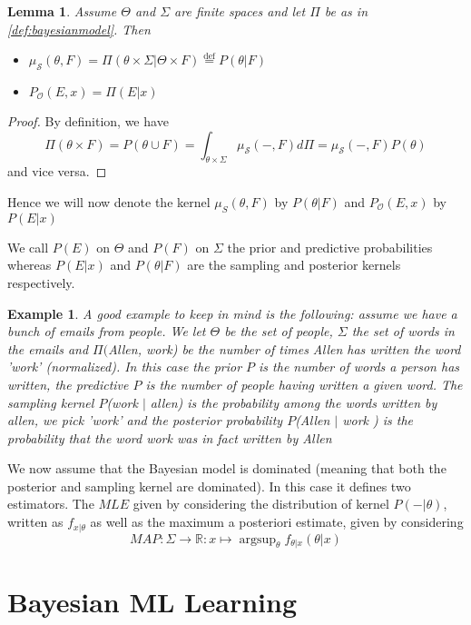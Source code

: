 \documentclass{book}
\theoremstyle{plain}
\newtheorem{example}[corollary]{Example}
\newtheorem{lemma}[corollary]{Lemma}
\theoremstyle{definition}
\DeclareMathOperator{\argsup}{argsup}
\renewcommand{\d}[1]{\mathbb{#1}}
\newcommand{\define}{\stackrel{\operatorname{def}}{=}}
\newcommand{\fun}{\mapsto}
\newcommand{\mor}{\longrightarrow}
\renewcommand{\r}[1]{\mathcal{#1}}
\begin{document}
\begin{lemma}
Assume $\Theta$ and $\Sigma$ are finite spaces and let $\Pi$ be as in \ref{def:bayesianmodel}. Then
\begin{itemize}
\item $\mu_\r{S}(\theta,F)=\Pi(\theta\times \Sigma \vert \Theta\times F)\define P(\theta\vert F)$
\item $P_\r{O}(E,x)=\Pi(E\vert x)$
\end{itemize}
\end{lemma}

\begin{proof}
By definition, we have
\[
\Pi(\theta \times F)=P(\theta\cup F)=\int_{\theta\times \Sigma} \mu_\r{S}(-,F)d\Pi=\mu_\r{S}(-,F)P(\theta)
\]
and vice versa.	
\end{proof}

Hence we will now denote the kernel $\mu_{S}(\theta , F)$ by $P(\theta \vert F)$ and $P_\r{O}(E,x)$ by $P(E\vert x)$

We call $P(E)$ on $\Theta$ and $P(F)$ on $\Sigma$ the prior and predictive probabilities whereas $P(E\vert x)$ and $P(\theta\vert F)$ are the sampling and posterior kernels respectively.

\begin{example}
A good example to keep in mind is the following: assume we have a bunch of emails from people. We let $\Theta$ be the set of people, $\Sigma$ the set of words in the emails and $\Pi($Allen, work) be the number of times Allen has written the word 'work' (normalized). In this case the prior  $P$ is the number of words a person has written, the predictive $P$  is the number of people having written a given word. The sampling kernel $P$(work $\vert$ allen) is the probability among the words written by allen, we pick 'work' and the posterior probability $P$(Allen $\vert$ work ) is the probability that the word work was in fact written by Allen
\end{example}
 
We now assume that the Bayesian model is dominated (meaning that both the posterior and sampling kernel are dominated). 
In this case it defines two estimators. The $MLE$ given by considering the distribution of kernel $P(- \vert \theta)$, written as $f_{x\vert \theta}$ as well as the maximum a posteriori estimate, given by considering
\[
MAP: \Sigma \mor \d{R}: x \fun \argsup_\theta f_{\theta \vert x}(\theta \vert x)
\] 
 
\section{Bayesian ML Learning} 
 
\end{document}
